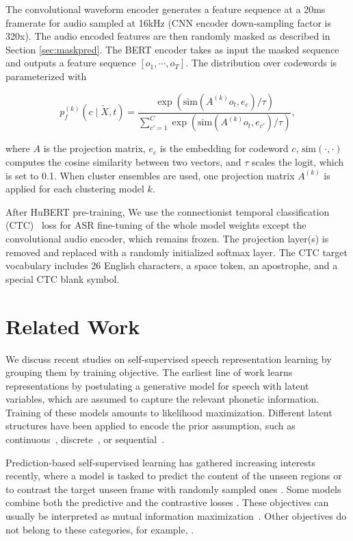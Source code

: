 The convolutional waveform encoder generates a feature sequence at a 20ms framerate for audio sampled at 16kHz (CNN encoder down-sampling factor is 320x). The audio encoded features are then randomly masked as described in Section \ref{sec:maskpred}. The BERT encoder takes as input the masked sequence and outputs a feature sequence $[o_1, \cdots, o_T]$. The distribution over codewords is parameterized with

\begin{equation}
    p_f^{(k)}(c \mid \tilde{X}, t) = \frac{\exp(\text{sim}(A^{(k)} o_t, e_c) / \tau)} {\sum_{c'=1}^C \exp(\text{sim}(A^{(k)} o_t, e_{c'}) / \tau)},
\end{equation}

where $A$ is the projection matrix, $e_c$ is the embedding for codeword $c$, $\text{sim}(\cdot, \cdot)$ computes the cosine similarity between two vectors, and $\tau$ scales the logit, which is set to 0.1. When cluster ensembles are used, one projection matrix $A^{(k)}$ is applied for each clustering model $k$.

After HuBERT pre-training, We use the connectionist temporal classification (CTC)~\cite{graves2006connectionist} loss for ASR fine-tuning of the whole model weights except the convolutional audio encoder, which remains frozen. The projection layer(s) is removed and replaced with a randomly initialized softmax layer. The CTC target vocabulary includes 26 English characters, a space token, an apostrophe, and a special CTC blank symbol.

\section{Related Work} We discuss recent studies on self-supervised speech representation learning by grouping them by training objective. The earliest line of work learns representations by postulating a generative model for speech with latent variables, which are assumed to capture the relevant phonetic information. Training of these models amounts to likelihood maximization. Different latent structures have been applied to encode the prior assumption, such as continuous~\cite{hsu2017learning}, discrete~\cite{chorowski2019unsupervised,van2017neural}, or sequential~\cite{hsu2017unsupervised,ebbers2017hidden,glarner2018full,khurana2019factorial,khurana2020convolutional}. 

Prediction-based self-supervised learning has gathered increasing interests recently, where a model is tasked to predict the content of the unseen regions \cite{chung2019unsupervised, chung2020generative, chung2020improved, ling2020deep, wang2020unsupervised, liu2020mockingjay, chi2020audio, ling2020decoar} or to contrast the target unseen frame with randomly sampled ones \cite{oord2018representation, kharitonov2020data, schneider2019wav2vec, baevski2020wav2vec}. Some models combine both the predictive and the contrastive losses \cite{baevski2019vq, baevski2019effectiveness}. These objectives can usually be interpreted as mutual information maximization~\cite{tsai2020ssl_multi}. Other objectives do not belong to these categories, for example, \cite{pascual2019learning}.

